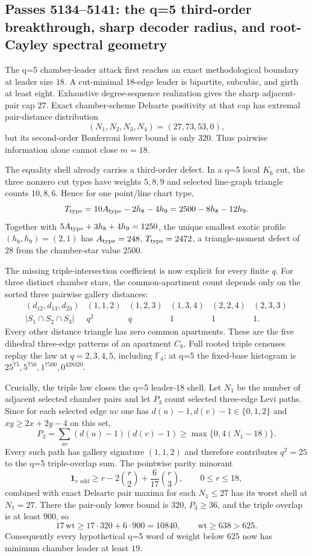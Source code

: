 \ifdefined\WPassFiveOneThreeFourLoaded\else
\gdef\WPassFiveOneThreeFourLoaded{1}
\subsection*{Passes 5134--5141: the q=5 third-order breakthrough, sharp decoder radius, and root-Cayley spectral geometry}
The q=5 chamber-leader attack first reaches an exact methodological boundary at leader size $18$.  A cut-minimal $18$-edge leader is bipartite, subcubic, and girth at least eight.  Exhaustive degree-sequence realization gives the sharp adjacent-pair cap $27$.  Exact chamber-scheme Delsarte positivity at that cap has extremal pair-distance distribution
\[
 (N_1,N_2,N_3,N_4)=(27,73,53,0),
\]
but its second-order Bonferroni lower bound is only $320$.  Thus pairwise information alone cannot close $m=18$.

The equality shell already carries a third-order defect.  In a q=5 local $K_6$ cut, the three nonzero cut types have weights $5,8,9$ and selected line-graph triangle counts $10,8,6$.  Hence for one point/line chart type,
\[
 T_{\rm type}=10A_{\rm type}-2h_8-4h_9=2500-8h_8-12h_9.
\]
Together with $5A_{\rm type}+3h_8+4h_9=1250$, the unique smallest exotic profile $(h_8,h_9)=(2,1)$ has $A_{\rm type}=248$, $T_{\rm type}=2472$, a triangle-moment defect of $28$ from the chamber-star value $2500$.

The missing triple-intersection coefficient is now explicit for every finite $q$.  For three distinct chamber stars, the common-apartment count depends only on the sorted three pairwise gallery distances:
\[
\begin{array}{c|ccccc}
(d_{12},d_{13},d_{23})&(1,1,2)&(1,2,3)&(1,3,4)&(2,2,4)&(2,3,3)\\ \hline
|S_1\cap S_2\cap S_3|&q^2&q&1&1&1.
\end{array}
\]
Every other distance triangle has zero common apartments.  These are the five dihedral three-edge patterns of an apartment $C_8$.  Full rooted triple censuses replay the law at $q=2,3,4,5$, including $\mathbb F_4$; at q=5 the fixed-base histogram is $25^{75},5^{750},1^{7500},0^{428320}$.

Crucially, the triple law closes the q=5 leader-$18$ shell.  Let $N_1$ be the number of adjacent selected chamber pairs and let $P_3$ count selected three-edge Levi paths.  Since for each selected edge $uv$ one has $d(u)-1,d(v)-1\in\{0,1,2\}$ and $xy\ge2x+2y-4$ on this set,
\[
 P_3=\sum_{uv}(d(u)-1)(d(v)-1)\ge \max\{0,4(N_1-18)\}.
\]
Every such path has gallery signature $(1,1,2)$ and therefore contributes $q^2=25$ to the q=5 triple-overlap sum.  The pointwise parity minorant
\[
 \mathbf 1_{r\text{ odd}}\ge r-2\binom r2+\frac6{17}\binom r3,\qquad 0\le r\le18,
\]
combined with exact Delsarte pair maxima for each $N_1\le27$ has its worst shell at $N_1=27$.  There the pair-only lower bound is $320$, $P_3\ge36$, and the triple overlap is at least $900$, so
\[
 17\,\mathrm{wt}\ge17\cdot320+6\cdot900=10840,
 \qquad \mathrm{wt}\ge638>625.
\]
Consequently every hypothetical q=5 word of weight below $625$ now has minimum chamber leader at least $19$.

